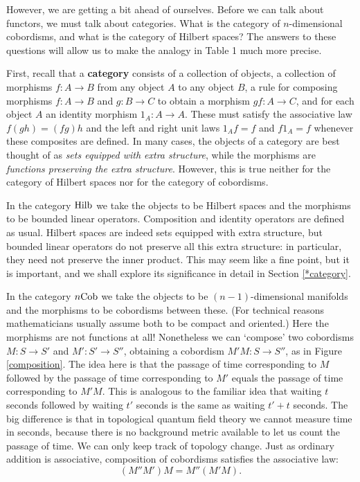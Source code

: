 \documentclass[12pt]{article}
\newcommand{\Hilb}{{\rm Hilb}}
\newcommand{\Cob}{{\rm Cob}}
\renewcommand{\to}{\rightarrow}
\newcommand{\maps}{\colon}
\begin{document}
However, we are getting a bit ahead of ourselves.  Before we can
talk about functors, we must talk about categories.  What is the 
category of $n$-dimensional cobordisms, and what is the category of 
Hilbert spaces?  The answers to these questions will allow us to make 
the analogy in Table 1 much more precise.

First, recall that a {\bf category} consists of a collection of 
objects, a collection of morphisms $f \maps A \to B$ from any object 
$A$ to any object $B$, a rule for composing morphisms $f \maps A \to B$ 
and $g \maps B \to C$ to obtain a morphism $gf \maps A \to C$, and for 
each object $A$ an identity morphism $1_A \maps A \to A$.  These must 
satisfy the associative law $f(gh) = (fg)h$ and the left and right unit 
laws $1_A f = f$ and $f 1_A = f$ whenever these composites are defined.
In many cases, the objects of a category are best thought of as
{\it sets equipped with extra structure}, while the morphisms are 
{\it functions preserving the extra structure}.  However, this is true
neither for the category of Hilbert spaces nor for the category of 
cobordisms.  

In the category $\Hilb$ we take the objects to be Hilbert spaces
and the morphisms to be bounded linear operators.  Composition and 
identity operators are defined as usual.  Hilbert spaces are indeed 
sets equipped with extra structure, but bounded linear operators do 
not preserve all this extra structure: in particular, they need not 
preserve the inner product.  This may seem like a fine point, but it 
is important, and we shall explore its significance in detail in 
Section \ref{*category}.

In the category $n\Cob$ we take the objects to be $(n-1)$-dimensional
manifolds and the morphisms to be cobordisms between these.  (For 
technical reasons mathematicians usually assume both to be compact and 
oriented.)  Here the morphisms are not functions at all!  Nonetheless 
we can `compose' two cobordisms $M\maps S \to S'$ and 
$M' \maps S' \to S''$, obtaining a cobordism $M' M \maps S \to S''$, as
in Figure \ref{composition}.  The idea here is that the passage of time 
corresponding to $M$ followed by the passage of time corresponding to 
$M'$ equals the passage of time corresponding to $M'M$.   This is 
analogous to the familiar idea that waiting $t$ seconds followed by 
waiting $t'$ seconds is the same as waiting $t'+t$ seconds. 
The big difference is that in topological quantum field theory we 
cannot measure time in seconds, because there is no background metric 
available to let us count the passage of time.  We can only keep track 
of topology change.  Just as ordinary addition is associative, 
composition of cobordisms satisfies the associative law:
\[                (M'' M') M = M'' (M' M)     .        \] 
\end{document}
